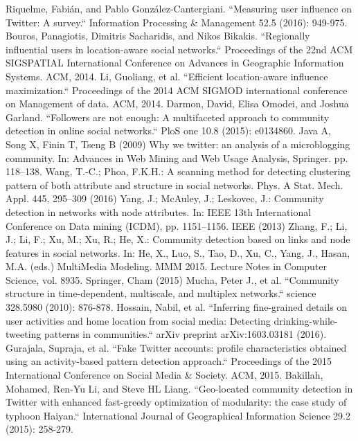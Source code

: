 \begin{thebibliography}{200}
Riquelme, Fabián, and Pablo González-Cantergiani. ``Measuring user influence on Twitter: A survey.`` Information Processing \& Management 52.5 (2016): 949-975.\label{appendix:2.1}
Bouros, Panagiotis, Dimitris Sacharidis, and Nikos Bikakis. ``Regionally influential users in location-aware social networks.`` Proceedings of the 22nd ACM SIGSPATIAL International Conference on Advances in Geographic Information Systems. ACM, 2014.\label{appendix:2.2}
Li, Guoliang, et al. ``Efficient location-aware influence maximization.`` Proceedings of the 2014 ACM SIGMOD international conference on Management of data. ACM, 2014.\label{appendix:2.3}
Darmon, David, Elisa Omodei, and Joshua Garland. ``Followers are not enough: A multifaceted approach to community detection in online social networks.`` PloS one 10.8 (2015): e0134860.\label{appendix:2.4}
Java A, Song X, Finin T, Tseng B (2009) Why we twitter: an analysis of a microblogging community. In: Advances in Web Mining and Web Usage Analysis, Springer. pp. 118–138.\label{appendix:2.5}
Wang, T.-C.; Phoa, F.K.H.: A scanning method for detecting clustering pattern of both attribute and structure in social networks. Phys. A Stat. Mech. Appl. 445, 295–309 (2016)\label{appendix:2.6}
Yang, J.; McAuley, J.; Leskovec, J.: Community detection in networks with node attributes. In: IEEE 13th International Conference on Data mining (ICDM), pp. 1151–1156. IEEE (2013)\label{appendix:2.7}
Zhang, F.; Li, J.; Li, F.; Xu, M.; Xu, R.; He, X.: Community detection based on links and node features in social networks. In: He, X., Luo, S., Tao, D., Xu, C., Yang, J., Hasan, M.A. (eds.) MultiMedia Modeling. MMM 2015. Lecture Notes in Computer Science, vol. 8935. Springer, Cham (2015)\label{appendix:2.8}
Mucha, Peter J., et al. ``Community structure in time-dependent, multiscale, and multiplex networks.`` science 328.5980 (2010): 876-878.\label{appendix:2.9}
Hossain, Nabil, et al. ``Inferring fine-grained details on user activities and home location from social media: Detecting drinking-while-tweeting patterns in communities.`` arXiv preprint arXiv:1603.03181 (2016).\label{appendix:2.10}
Gurajala, Supraja, et al. ``Fake Twitter accounts: profile characteristics obtained using an activity-based pattern detection approach.`` Proceedings of the 2015 International Conference on Social Media \& Society. ACM, 2015.\label{appendix:2.11}
Bakillah, Mohamed, Ren-Yu Li, and Steve HL Liang. ``Geo-located community detection in Twitter with enhanced fast-greedy optimization of modularity: the case study of typhoon Haiyan.`` International Journal of Geographical Information Science 29.2 (2015): 258-279.\label{appendix:2.12}

\end{thebibliography}

